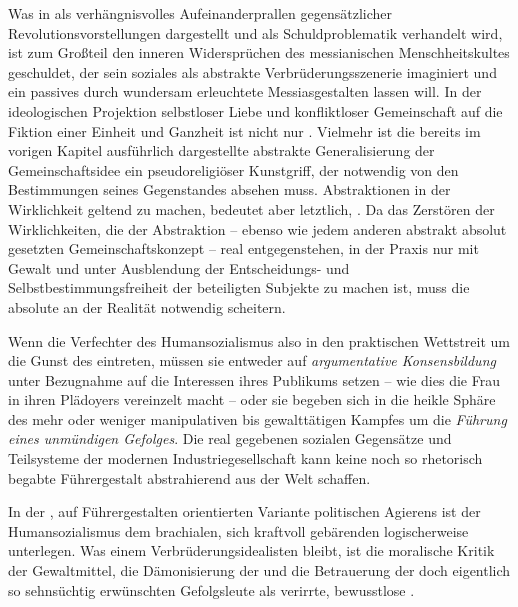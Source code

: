 Was in \Cite{Masse Mensch} als verhängnisvolles Aufeinanderprallen
gegensätzlicher Revolutionsvorstellungen dargestellt und als Schuldproblematik
verhandelt wird, ist zum Großteil den inneren Widersprüchen des messianischen
Menschheitskultes geschuldet, der sein soziales  als abstrakte
Verbrüderungsszenerie imaginiert und ein passives \Cite{Volk} durch wundersam
erleuchtete Messiasgestalten  lassen will. In der
ideologischen Projektion selbstloser Liebe und konfliktloser Gemeinschaft auf
die Fiktion einer Einheit und Ganzheit  ist nicht nur
. Vielmehr ist die bereits im vorigen
Kapitel ausführlich dargestellte abstrakte Generalisierung der
Gemeinschaftsidee ein pseudoreligiöser Kunstgriff, der notwendig von den
Bestimmungen seines Gegenstandes absehen muss. Abstraktionen in der
Wirklichkeit geltend zu machen, bedeutet aber letztlich, \Cite{Wirklichkeit zu
  zerstören}. 
Da das Zerstören der Wirklichkeiten, die der Abstraktion \Cite{Menschheit} 
-- ebenso wie jedem anderen abstrakt absolut gesetzten Gemeinschaftskonzept --
real entgegenstehen, in der Praxis nur mit Gewalt und unter Ausblendung der
Entscheidungs- und Selbstbestimmungsfreiheit der beteiligten Subjekte zu
machen ist, muss die absolute  an der Realität
notwendig scheitern.

Wenn die Verfechter des Humansozialismus also in den praktischen Wettstreit um
die Gunst des \Cite{Volkes} eintreten, müssen sie entweder auf
\emph{argumentative Konsensbildung} unter Bezugnahme auf die Interessen ihres
Publikums setzen -- wie dies die Frau in ihren Plädoyers vereinzelt
macht -- oder sie begeben sich in die heikle Sphäre des mehr oder weniger manipulativen
bis gewalttätigen Kampfes um die \emph{Führung eines unmündigen Gefolges}. Die
real gegebenen sozialen Gegensätze und Teilsysteme der modernen
Industriegesellschaft kann keine noch so rhetorisch begabte
Führergestalt abstrahierend aus der Welt schaffen.     

In der , auf Führergestalten orientierten Variante
politischen Agierens ist der  Humansozialismus dem brachialen,
sich kraftvoll gebärenden  logischerweise
unterlegen. Was einem Verbrüderungsidealisten bleibt, ist die moralische Kritik
der Gewaltmittel, die Dämonisierung der  und die
Betrauerung der doch eigentlich so sehnsüchtig erwünschten Gefolgsleute als
verirrte, bewusstlose \Cite{Masse}.

